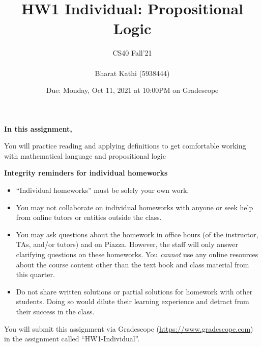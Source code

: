 \documentclass[12pt, oneside]{article}
\title{HW1 Individual: Propositional Logic}
\author{CS40 Fall'21\\\\Bharat Kathi (5938444)}
\date{Due: Monday, Oct 11, 2021 at 10:00PM on Gradescope}
\begin{document}
\maketitle

{\bf In this assignment,}

You will practice reading and
applying definitions to get comfortable working with mathematical language and propositional logic

{\bf Integrity reminders for individual homeworks}
\begin{itemize}
\item ``Individual homeworks'' must be solely your own work. 
\item You may not collaborate on individual homeworks with anyone or seek help from online tutors or entities outside the class.
\item You may ask questions about the homework in office hours (of the instructor, TAs, and/or tutors) and 
on Piazza.  However, the staff will only answer clarifying questions on these homeworks. You \emph{cannot} use any online resources about the course content other than the text
book and class material from this quarter.
\item Do not share written solutions or partial solutions for homework with other students. Doing so would dilute their learning experience and detract from their success in the class.
\end{itemize}


You will submit this assignment via Gradescope
(\href{https://www.gradescope.com}{https://www.gradescope.com}) in the assignment called ``HW1-Individual''.

\newpage
\end{document}
